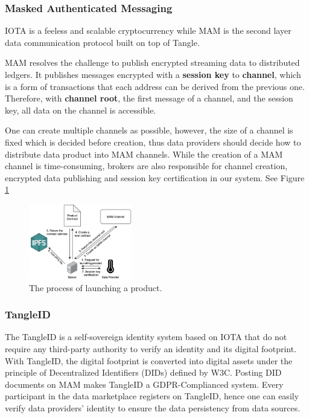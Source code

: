 \documentclass[journal,10pt,a4paper]{IEEEtran}
\begin{document}
\subsubsection{Masked Authenticated Messaging}
IOTA\cite{IOTAwhitepaper} is a feeless and scalable cryptocurrency while MAM is the second layer data communication protocol built on top of Tangle. 

MAM resolves the challenge to publish encrypted streaming data to distributed ledgers. It publishes messages encrypted with a \textbf{session key} to \textbf{channel}, which is a form of transactions that each address can be derived from the previous one. Therefore, with \textbf{channel root}, the first message of a channel, and the session key, all data on the channel is accessible. 

One can create multiple channels as possible, however, the size of a channel is fixed which is decided before creation, thus data providers should decide how to distribute data product into MAM channels. While the creation of a MAM channel is time-consuming, brokers are also responsible for channel creation, encrypted data publishing and session key certification in our system. See Figure \ref{fig:launching_product}  

\begin{figure}[h]
	\centering
	\includegraphics[width=0.4\textwidth]{launching_product}
	\caption{The process of launching a product.}
	\label{fig:launching_product}
\end{figure}

\subsubsection{TangleID}
The TangleID\cite{TangleID} is a self-sovereign identity system based on IOTA that do not require any third-party authority to verify an identity and its digital footprint. With TangleID, the digital footprint is converted into digital assets under the principle of Decentralized Identifiers (DIDs)\cite{DID} defined by W3C. Posting DID documents on MAM makes TangleID a GDPR-Complianced system. Every participant in the data marketplace registers on TangleID, hence one can easily verify data providers' identity to ensure the data persistency from data sources.
\end{document}

